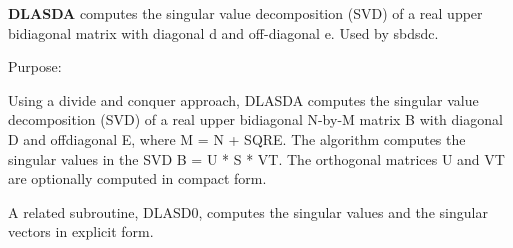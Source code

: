 {\bfseries D\+L\+A\+S\+D\+A} computes the singular value decomposition (S\+V\+D) of a real upper bidiagonal matrix with diagonal d and off-\/diagonal e. Used by sbdsdc. 

 \begin{DoxyParagraph}{Purpose\+: }
\begin{DoxyVerb} Using a divide and conquer approach, DLASDA computes the singular
 value decomposition (SVD) of a real upper bidiagonal N-by-M matrix
 B with diagonal D and offdiagonal E, where M = N + SQRE. The
 algorithm computes the singular values in the SVD B = U * S * VT.
 The orthogonal matrices U and VT are optionally computed in
 compact form.

 A related subroutine, DLASD0, computes the singular values and
 the singular vectors in explicit form.\end{DoxyVerb}
 
\end{DoxyParagraph}

